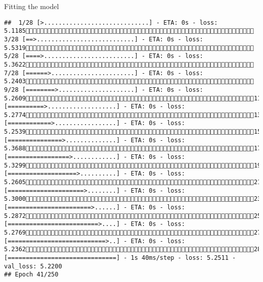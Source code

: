 \documentclass[
  ignorenonframetext,
]{beamer}
\begin{document}
\begin{frame}[fragile]{Fitting the model}
\begin{verbatim}
##  1/28 [>.............................] - ETA: 0s - loss: 5.1185 3/28 [==>...........................] - ETA: 0s - loss: 5.5319 5/28 [====>.........................] - ETA: 0s - loss: 5.3622 7/28 [======>.......................] - ETA: 0s - loss: 5.2403 9/28 [========>.....................] - ETA: 0s - loss: 5.260911/28 [==========>...................] - ETA: 0s - loss: 5.277413/28 [============>.................] - ETA: 0s - loss: 5.253915/28 [===============>..............] - ETA: 0s - loss: 5.368817/28 [=================>............] - ETA: 0s - loss: 5.329919/28 [===================>..........] - ETA: 0s - loss: 5.260521/28 [=====================>........] - ETA: 0s - loss: 5.300023/28 [=======================>......] - ETA: 0s - loss: 5.287225/28 [=========================>....] - ETA: 0s - loss: 5.276927/28 [===========================>..] - ETA: 0s - loss: 5.236228/28 [==============================] - 1s 40ms/step - loss: 5.2511 - val_loss: 5.2200
## Epoch 41/250

\end{verbatim}
\end{frame}
\end{document}
